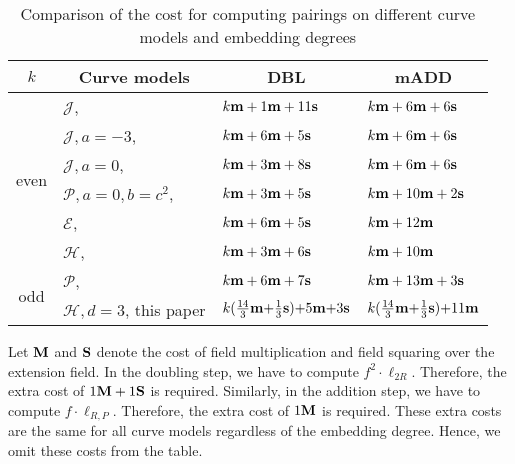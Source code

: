 \begin{table}[h]
\centering
\caption{Comparison of the cost for computing pairings on different curve models and embedding degrees}

\begin{tabular}{ l | l | l | l}
\hline
\multicolumn{1}{c|}{$k$}
&\multicolumn{1}{c|}{Curve models}	&\multicolumn{1}{c|}{DBL}	&\multicolumn{1}{c}{mADD}	\\
\hline
\multicolumn{1}{c|}{\multirow{6}{*}{even}}
&$\mathcal{J}$, \cite{2008/IonicaJoux08} \cite{2009/fastertate}
				&$k\textbf{m} + 1\textbf{m} + 11\textbf{s}	$	&$k\textbf{m} + 6\textbf{m} + 6\textbf{s}$	\\
&$\mathcal{J},a = -3$, \cite{2009/fastertate}
				&$k\textbf{m} + 6\textbf{m} + 5\textbf{s}$		&$k\textbf{m} + 6\textbf{m} + 6\textbf{s}$	\\
&$\mathcal{J},a = 0$, \cite{2009/fastertate}		
				&$k\textbf{m} + 3\textbf{m} + 8\textbf{s}$		&$k\textbf{m} + 6\textbf{m} + 6\textbf{s}$	\\
&$\mathcal{P},a = 0, b = c^2$, \cite{2009/craig}
				&$k\textbf{m} + 3\textbf{m} + 5\textbf{s}$		&$k\textbf{m} + 10\textbf{m} + 2\textbf{s}$	\\
&$\mathcal{E}$, \cite{2009/fastertate}			
				&$k\textbf{m} + 6\textbf{m} + 5\textbf{s}$		&$k\textbf{m} + 12\textbf{m}$	\\
&$\mathcal{H}$, \cite{2010/Gu}	&$k\textbf{m} + 3\textbf{m} + 6\textbf{s}$		&$k\textbf{m} + 10\textbf{m}$	\\
\hline
\multicolumn{1}{c|}{\multirow{2}{*}{odd}}
&$\mathcal{P}$, \cite{2010/CLN}	&$k\textbf{m} + 6\textbf{m} + 7\textbf{s}$		&$k\textbf{m} + 13\textbf{m} + 3\textbf{s}$	\\
&$\mathcal{H},d=3$, this paper
				&$k(\frac{14}{3}\textbf{m} {+} \frac{1}{3}\textbf{s}) {+} 5\textbf{m} {+} 3\textbf{s}$
									&$k(\frac{14}{3}\textbf{m} {+} \frac{1}{3}\textbf{s}) {+} 11\textbf{m}$	\\
\hline
\end{tabular}
\label{tbl-cmp}


\end{table}

Let $\textbf{M}$ and $\textbf{S}$ denote the cost of field multiplication and field squaring over the extension field.
In the doubling step,
we have to compute $f^2 \cdot \ell_{2R}$.
Therefore, the extra cost of $1\textbf{M} + 1\textbf{S}$ is required.
Similarly, in the addition step,
we have to compute $f \cdot \ell_{R,P}$.
Therefore, the extra cost of $1\textbf{M}$ is required.
These extra costs are the same for all curve models regardless of the embedding degree.
Hence, we omit these costs from the table.

